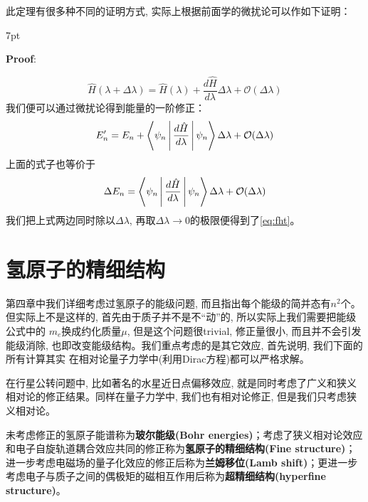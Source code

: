 \documentclass[a4paper,zihao=-4,linespread=1]{ctexrep}
\newenvironment{thinknote}{%
\def\FrameCommand{%
\hspace{1pt}%
{\color{BurlyWood}\vrule width 2pt}%
{\color{formalshade}\vrule width 4pt}%
\colorbox{formalshade}%
}%
\MakeFramed{\advance\hsize-\width\FrameRestore}%
\noindent\hspace{-4.55pt}%
\begin{adjustwidth}{}{7pt}%
\vspace{2pt}\vspace{2pt}%
}
{%
\vspace{2pt}\end{adjustwidth}\endMakeFramed%
}
\begin{document}
    此定理有很多种不同的证明方式, 实际上根据前面学的微扰论可以作如下证明：
    \begin{thinknote}
        \textbf{Proof}:

            \begin{equation*}
                \hat{H}(\lambda+\Delta\lambda)=\hat{H}(\lambda)+\frac{d\hat{H}}{d\lambda}\Delta\lambda+\mathcal{O}(\Delta\lambda)
            \end{equation*}
            我们便可以通过微扰论得到能量的一阶修正：
            \begin{equation*}
                E_n^\prime=E_n+\Braket{\psi_n|\frac{d\hat{H}}{d\lambda}|\psi_n}\Delta\lambda+\mathcal{O}(\Delta\lambda)
            \end{equation*}
            上面的式子也等价于
            \begin{equation*}
                \Delta E_n=\Braket{\psi_n|\frac{d\hat{H}}{d\lambda}|\psi_n}\Delta\lambda+\mathcal{O}(\Delta\lambda)
            \end{equation*}
            我们把上式两边同时除以$\Delta\lambda$, 再取$\Delta\lambda\to 0$的极限便得到了\ref{eq:fht}。
    \end{thinknote}

    \section{氢原子的精细结构}
    第四章中我们详细考虑过氢原子的能级问题, 而且指出每个能级的简并态有$n^2$个。但实际上不是这样的, 首先由于质子并不是不“动”的, 所以实际上我们需要把能级公式中的
    $m_e$换成约化质量$\mu$, 但是这个问题很trivial, 修正量很小, 而且并不会引发能级消除, 也即改变能级结构。我们重点考虑的是其它效应, 首先说明, 我们下面的所有计算其实
    在相对论量子力学中(利用Dirac方程)都可以严格求解。

    在行星公转问题中, 比如著名的水星近日点偏移效应, 就是同时考虑了广义和狭义相对论的修正结果。同样在量子力学中, 我们也有相对论修正, 但是我们只考虑狭义相对论。
    
    未考虑修正的氢原子能谱称为\textbf{玻尔能级(Bohr energies)}；考虑了狭义相对论效应和电子自旋轨道耦合效应共同的修正称为\textbf{氢原子的精细结构(Fine structure)}；
    进一步考虑电磁场的量子化效应的修正后称为\textbf{兰姆移位(Lamb shift)}；更进一步考虑电子与质子之间的偶极矩的磁相互作用后称为\textbf{超精细结构(hyperfine structure)}。
    
\end{document}
